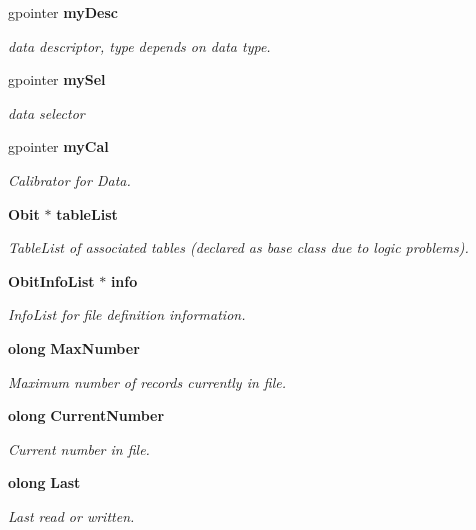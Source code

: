 \begin{CompactItemize}
gpointer {\bf my\-Desc}
\begin{CompactList}\small\item\em data descriptor, type depends on data type. \item\end{CompactList}\item 
gpointer {\bf my\-Sel}
\begin{CompactList}\small\item\em data selector \item\end{CompactList}\item 
gpointer {\bf my\-Cal}
\begin{CompactList}\small\item\em Calibrator for Data. \item\end{CompactList}\item 
{\bf Obit} $\ast$ {\bf table\-List}
\begin{CompactList}\small\item\em Table\-List of associated tables (declared as base class due to logic problems). \item\end{CompactList}\item 
{\bf Obit\-Info\-List} $\ast$ {\bf info}
\begin{CompactList}\small\item\em Info\-List for file definition information. \item\end{CompactList}\item 
{\bf olong} {\bf Max\-Number}
\begin{CompactList}\small\item\em Maximum number of records currently in file. \item\end{CompactList}\item 
{\bf olong} {\bf Current\-Number}
\begin{CompactList}\small\item\em Current number in file. \item\end{CompactList}\item 
{\bf olong} {\bf Last}
\begin{CompactList}\small\item\em Last read or written. \item\end{CompactList}\end{CompactItemize}


